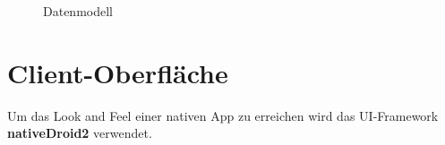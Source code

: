 \begin{figure}[htp] 
\caption{Datenmodell}
\label{image_konzeption_datenmodell}
\end{figure} 

\newpage
\section{Client-Oberfläche}
\label{sec_konzeption_client-ui}



Um das \glqq{}Look and Feel\grqq{} einer nativen App zu erreichen wird das UI-Framework \textbf{nativeDroid2} verwendet. \\
